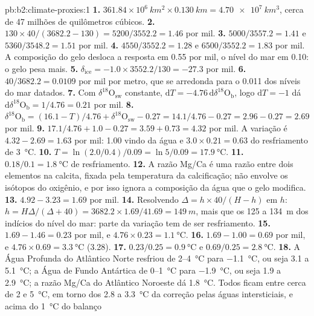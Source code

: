 \begin{solution}{pb:b2:climate-proxies:1}
\textbf{1.} $361.84 \times 10^6\ \unit{km^2} \times \qty{0.130}{km} = \qty{4.70e7}{km^3}$, cerca de 47
milhões de quilômetros cúbicos.
\textbf{2.} $130 \times 40/(3682.2 - 130) = 5200/3552.2 = 1.46$ por mil.
\textbf{3.} $5000/3557.2 = 1.41$ e $5360/3548.2 = 1.51$ por mil.
\textbf{4.} $4550/3552.2 = 1.28$ e $6500/3552.2 = 1.83$ por mil. A composição do gelo
desloca a resposta em \num{0.55} por mil, o nível do mar em \num{0.10}: o gelo pesa mais.
\textbf{5.} $\delta_{\mathrm{ice}} = -1.0 \times 3552.2/130 = -27.3$ por mil.
\textbf{6.} $40/3682.2 = 0.0109$ por mil por metro, que se arredonda para o \num{0.011} dos níveis do mar
datados.
\textbf{7.} Com $\delta^{18}\mathrm{O}_{\mathrm{sw}}$ constante, $\mathrm{d}T = -4.76\,\mathrm{d}\delta^{18}
\mathrm{O}_{\mathrm{b}}$, logo $\mathrm{d}T = -1$ dá $\mathrm{d}\delta^{18}\mathrm{O}_{\mathrm{b}} =
1/4.76 = 0.21$ por mil.
\textbf{8.} $\delta^{18}\mathrm{O}_{\mathrm{b}} = (16.1 - T)/4.76 + \delta^{18}\mathrm{O}_{\mathrm{sw}}
- 0.27 = 14.1/4.76 - 0.27 = 2.96 - 0.27 = 2.69$ por mil.
\textbf{9.} $17.1/4.76 + 1.0 - 0.27 = 3.59 + 0.73 = 4.32$ por mil. A variação é $4.32 - 2.69 =
1.63$ por mil: \num{1.00} vindo da água e $3.0 \times 0.21 = 0.63$ do resfriamento de
\qty{3}{\celsius}.
\textbf{10.} $T = \ln(2.0/0.4)/0.09 = \ln 5/0.09 = \qty{17.9}{\celsius}$.
\textbf{11.} $0.18/0.1 = \qty{1.8}{\celsius}$ de resfriamento.
\textbf{12.} A razão Mg/Ca é uma razão entre dois elementos na calcita, fixada pela temperatura da
calcificação; não envolve os isótopos do oxigênio, e por isso ignora a composição da
água que o gelo modifica.
\textbf{13.} $4.92 - 3.23 = 1.69$ por mil.
\textbf{14.} Resolvendo $\Delta = h \times 40/(H - h)$ em $h$: $h = H\Delta/(\Delta + 40) = 3682.2
\times 1.69/41.69 = \qty{149}{m}$, mais que os 125 a \qty{134}{m} dos indícios do nível do mar:
parte da variação tem de ser resfriamento.
\textbf{15.} $1.69 - 1.46 = 0.23$ por mil, e $4.76 \times 0.23 = \qty{1.1}{\celsius}$.
\textbf{16.} $1.69 - 1.00 = 0.69$ por mil, e $4.76 \times 0.69 = \qty{3.3}{\celsius}$ (3.28).
\textbf{17.} $0.23/0.25 = \qty{0.9}{\celsius}$ e $0.69/0.25 = \qty{2.8}{\celsius}$.
\textbf{18.} A Água Profunda do Atlântico Norte resfriou de 2--\qty{4}{\celsius} para \qty{-1.1}{\celsius},
ou seja 3.1 a \qty{5.1}{\celsius}; a Água de Fundo Antártica de 0--\qty{1}{\celsius} para
\qty{-1.9}{\celsius}, ou seja 1.9 a \qty{2.9}{\celsius}; a razão Mg/Ca do Atlântico Noroeste dá
\qty{1.8}{\celsius}. Todos ficam entre cerca de 2 e \qty{5}{\celsius}, em torno dos 2.8 a
\qty{3.3}{\celsius} da correção pelas águas intersticiais, e acima do \qty{1}{\celsius} do balanço

\end{solution}

